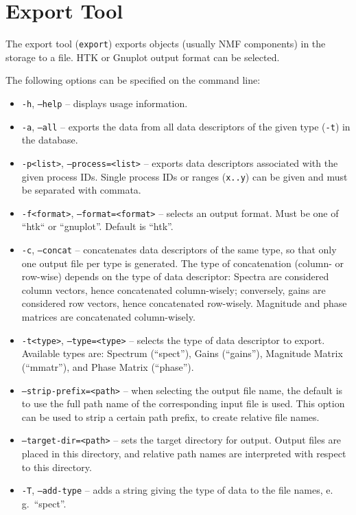 \section{Export Tool}

The export tool ({\tt export}) exports objects (usually NMF components)
in the storage to a file.
HTK or Gnuplot output format can be selected.

\noindent The following options can be specified on the command line:
\begin{itemize}
  \item {\tt -h}, {\tt --help} -- displays usage information.
  \item {\tt -a}, {\tt --all} -- exports the data from all data descriptors of
    the given type ({\tt -t}) in the database.
  \item {\tt -p<list>}, {\tt --process=<list>} -- exports data descriptors 
    associated with the given process IDs. Single process IDs or ranges 
    ({\tt x..y}) can be given and must be separated with commata.
  \item {\tt -f<format>}, {\tt --format=<format>} -- selects an output format.
    Must be one of ``htk`` or ``gnuplot''. Default is ``htk''.
  \item {\tt -c}, {\tt --concat} -- concatenates data descriptors of the same
  type, so that only one output file per type is generated.
  The type of concatenation (column- or row-wise) depends on the type of
  data descriptor: Spectra are considered column vectors, hence concatenated
  column-wisely; conversely, gains are considered row vectors, hence
  concatenated row-wisely. Magnitude and phase matrices are concatenated
  column-wisely.
  \item {\tt -t<type>}, {\tt --type=<type>} -- selects the type of data
  descriptor to export. Available types are: Spectrum (``spect''), Gains
  (``gains''), Magnitude Matrix (``mmatr''), and Phase Matrix (``phase'').
  \item {\tt --strip-prefix=<path>} -- when selecting the output file name, the
  default is to use the full path name of the corresponding input file is used.
  This option can be used to strip a certain path prefix, to create relative
  file names.
  \item {\tt --target-dir=<path>} -- sets the target directory for output.
  Output files are placed in this directory, and relative path names are
  interpreted with respect to this directory.
  \item {\tt -T}, {\tt --add-type} -- adds a string giving the type of data to
  the file names, e.\,g.\ ``spect''.
\end{itemize}


